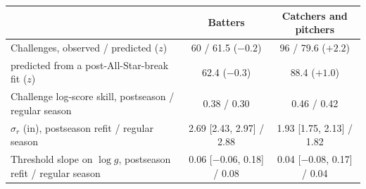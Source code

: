 \begin{tabular}{lcc}
\toprule
 & Batters & Catchers and pitchers \\
\midrule
Challenges, observed / predicted ($z$) & 60 / 61.5 ($-0.2$) & 96 / 79.6 ($+2.2$) \\
\quad predicted from a post-All-Star-break fit ($z$) & 62.4 ($-0.3$) & 88.4 ($+1.0$) \\
Challenge log-score skill, postseason / regular season & 0.38 / 0.30 & 0.46 / 0.42 \\
$\sigma_r$ (in), postseason refit / regular season & 2.69 [2.43, 2.97] / 2.88 & 1.93 [1.75, 2.13] / 1.82 \\
Threshold slope on $\log g$, postseason refit / regular season & 0.06 [\ensuremath{-}0.06, 0.18] / 0.08 & 0.04 [\ensuremath{-}0.08, 0.17] / 0.04 \\
\bottomrule
\end{tabular}
